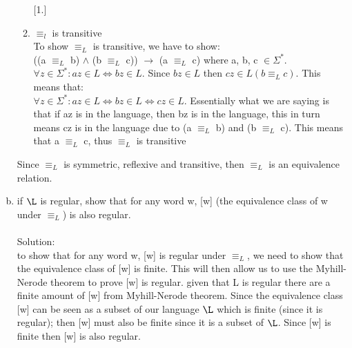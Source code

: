 \documentclass{article}
\newcommand*\moveToRight[1]{\hspace*{0em plus 1fill}\makebox{(#1)}}
\begin{document}
\begin{enumerate}[(a)]
\begin{enumerate} [1.]
        \item $\equiv_l$ is transitive\\
        To show $\equiv_L$ is transitive, we have to show:\\
        ((a $\equiv_L$ b) $\land$ (b $\equiv_L$ c)) $\to$ (a $\equiv_L$ c) where a, b, c $\in \Sigma^*$.\\
        $\forall z \in \Sigma^* : az \in L \Leftrightarrow bz \in L.$ Since $bz \in L $ then $cz \in L (b \equiv_L c)$. This means that:\\ $\forall z \in \Sigma^* : az \in L \Leftrightarrow bz \in L \Leftrightarrow cz \in L$. Essentially what we are saying is that if az is in the language, then bz is in the language, this in turn means cz is in the language due to (a $\equiv_L$ b) and (b $\equiv_L$ c). This means that a $\equiv_L$ c, thus $\equiv_L$ is transitive
    \end{enumerate}
    Since $\equiv_L$ is symmetric, reflexive and transitive, then $\equiv_L$ is an equivalence relation.
    \item if $\L$ is regular, show that for any word w, [w] (the equivalence class of w under $\equiv_L$) is also regular. \moveToRight{4 marks}\\\\
    Solution:\\
    to show that for any word w, [w] is regular under $\equiv_L$, we need to show that the equivalence class of [w] is finite. This will then allow us to use the Myhill-Nerode theorem to prove [w] is regular. given that L is regular there are a finite amount of [w] from Myhill-Nerode theorem. Since the equivalence class [w] can be seen as a subset of our language $\L$ which is finite (since it is regular); then [w] must also be finite since it is a subset of $\L$. Since [w] is finite then [w] is also regular.

    
\end{enumerate}
\end{document}
